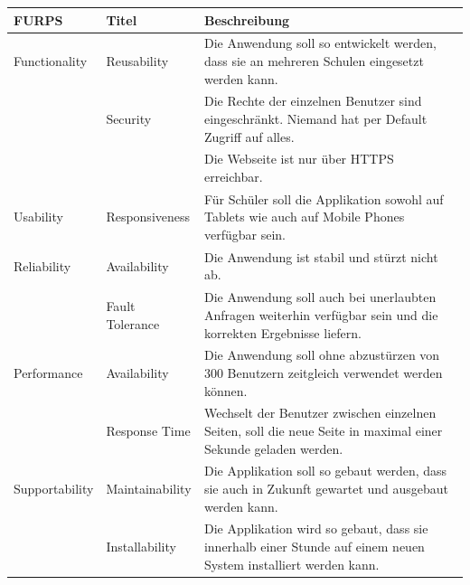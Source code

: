 \renewcommand{\arraystretch}{1.2}
\begin{table}[h]
	\centering
	\begin{tabu} to 0.9\textwidth {l l X}
	\toprule
	FURPS & Titel & Beschreibung \\ 
	\midrule
	Functionality & Reusability & Die Anwendung soll so entwickelt werden, dass sie an mehreren Schulen eingesetzt werden kann. \\
	& 	Security & Die Rechte der einzelnen Benutzer sind eingeschränkt. Niemand hat per Default Zugriff auf alles. \\
	&  & Die Webseite ist nur über HTTPS erreichbar. \\
	\midrule
	Usability & Responsiveness & Für Schüler soll die Applikation sowohl auf Tablets wie auch auf Mobile Phones verfügbar sein. \\
	\midrule
	Reliability & Availability & Die Anwendung ist stabil und stürzt nicht ab. \\
	& Fault Tolerance & Die Anwendung soll auch bei unerlaubten Anfragen weiterhin verfügbar sein und die korrekten Ergebnisse liefern. \\
	\midrule
	Performance & Availability & Die Anwendung soll ohne abzustürzen von 300 Benutzern zeitgleich verwendet werden können. \\
	 & Response Time & Wechselt der Benutzer zwischen einzelnen Seiten, soll die neue Seite in maximal einer Sekunde geladen werden.\\
	\midrule
	Supportability & Maintainability & Die Applikation soll so gebaut werden, dass sie auch in Zukunft gewartet und ausgebaut werden kann. \\
	 & Installability & Die Applikation wird so gebaut, dass sie innerhalb einer Stunde auf einem neuen System installiert werden kann. \\
	\bottomrule
	\end{tabu}
	\label{nfr}
\end{table}


\newpage